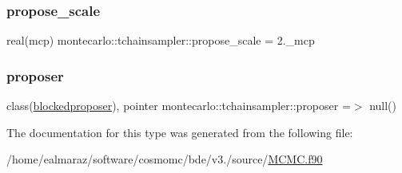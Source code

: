 \mbox{\label{structmontecarlo_1_1tchainsampler_a960d9a60918fbba00ce757b21ba3e3fa}} 
\subsubsection{\texorpdfstring{propose\+\_\+scale}{propose\_scale}}
{\footnotesize\ttfamily real(mcp) montecarlo\+::tchainsampler\+::propose\+\_\+scale = 2.\+\_\+mcp\hspace{0.3cm}{\ttfamily [private]}}

\mbox{\label{structmontecarlo_1_1tchainsampler_a8021f41394264a9a25162b3a7d9b1082}} 
\subsubsection{\texorpdfstring{proposer}{proposer}}
{\footnotesize\ttfamily class(\mbox{\hyperlink{structpropose_1_1blockedproposer}{blockedproposer}}), pointer montecarlo\+::tchainsampler\+::proposer =$>$ null()\hspace{0.3cm}{\ttfamily [private]}}



The documentation for this type was generated from the following file\+:\begin{DoxyCompactItemize}
\item 
/home/ealmaraz/software/cosmomc/bde/v3./source/\mbox{\hyperlink{MCMC_8f90}{M\+C\+M\+C.\+f90}}\end{DoxyCompactItemize}

